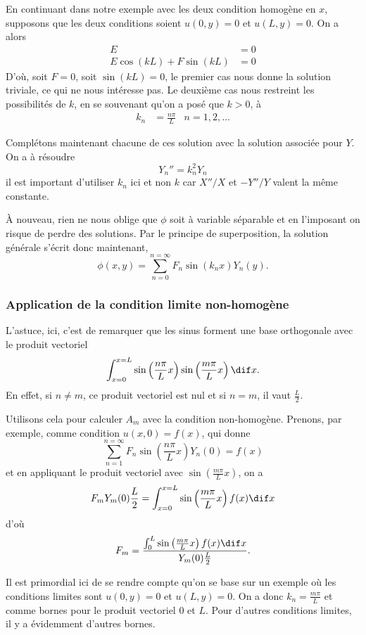 En continuant dans notre exemple avec les deux
condition homogène en $x$, supposons que les deux
conditions soient $u(0, y) = 0$ et $u(L, y) = 0$.
On a alors
\begin{align*}
  E & = 0\\
  E\cos(kL) + F\sin(kL) & = 0
\end{align*}
D'où, soit $F = 0$, soit $\sin(kL) = 0$, le premier cas nous
donne la solution triviale, ce qui ne nous intéresse pas.
Le deuxième cas nous restreint les possibilités de $k$,
en se souvenant qu'on a posé que $k > 0$, à
\begin{align*}
  k_n & = \frac{n\pi}{L} & n = 1, 2, \ldots
\end{align*}

Complétons maintenant chacune de ces solution avec la solution
associée pour $Y$.
On a à résoudre
\[ Y_n'' = k_n^2Y_n \]
il est important d'utiliser $k_n$ ici et non $k$
car $X''/X$ et $-Y''/Y$ valent la même constante.

À nouveau, rien ne nous oblige que $\phi$ soit à variable
séparable et en l'imposant on risque de perdre des solutions.
Par le principe de superposition,
la solution générale s'écrit donc maintenant,
\[ \phi(x,y) = \sum_{n=0}^{n=\infty} F_n \sin(k_nx)Y_n(y). \]

\subsubsection{Application de la condition limite non-homogène}
L'astuce, ici, c'est de remarquer que les sinus
forment une base orthogonale avec le produit vectoriel
\[ \int_{x = 0}^{x = L} \sin\left(\frac{n\pi}{L} x\right)
\sin\left(\frac{m\pi}{L} x\right) \dif x. \]
En effet, si $n \neq m$, ce produit vectoriel est nul et
si $n = m$, il vaut $\frac{L}{2}$.

Utilisons cela pour calculer $A_m$ avec la condition non-homogène.
Prenons, par exemple, comme condition $u(x, 0) = f(x)$, qui donne
\[ \sum_{n = 1}^{n = \infty} F_n \sin\left(\frac{n\pi}{L} x\right) Y_n(0)
= f(x) \]
et en appliquant le produit vectoriel avec
$\sin\left(\frac{m\pi}{L} x\right)$, on a
\[ F_mY_m(0)\frac{L}{2} =
\int_{x=0}^{x=L} \sin\left(\frac{m\pi}{L}x\right) f(x) \dif x \]
d'où
\[ F_m = \frac{
\int_{0}^{L} \sin\left(\frac{m\pi}{L}x\right) f(x) \dif x}
{Y_m(0)\frac{L}{2}}. \]
\begin{myrem}
  Il est primordial ici de se rendre compte qu'on se base sur un
  exemple où les conditions limites sont $u(0, y) = 0$ et $u(L, y) = 0$.
  On a donc $k_n = \frac{m\pi}{L}$ et comme bornes pour le produit
  vectoriel 0 et $L$.
  Pour d'autres conditions limites, il y a évidemment d'autres bornes.
\end{myrem}


